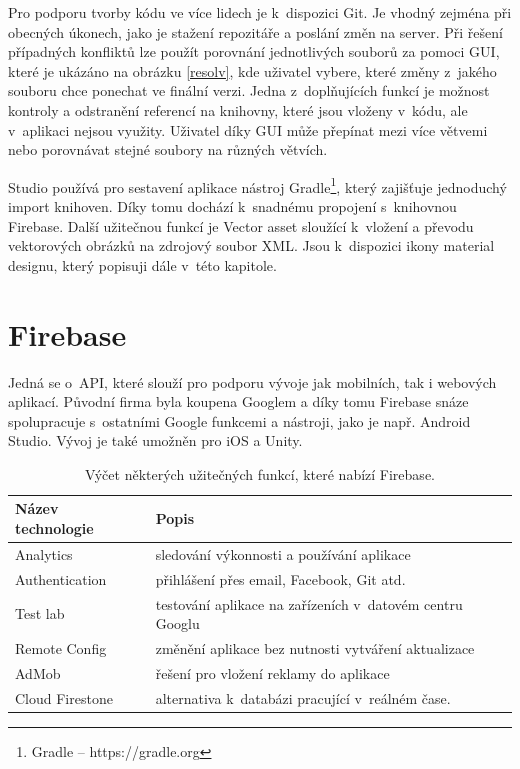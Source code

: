 Pro podporu tvorby kódu ve více lidech je k~dispozici Git. Je vhodný zejména při obecných úkonech, jako je stažení repozitáře a poslání změn na server. Při řešení případných konfliktů lze použít porovnání jednotlivých souborů za pomoci GUI, které je ukázáno na obrázku \ref{resolv}, kde uživatel vybere, které změny z~jakého souboru chce ponechat ve finální verzi. Jedna z~doplňujících funkcí je možnost kontroly a odstranění referencí na knihovny, které jsou vloženy v~kódu, ale v~aplikaci nejsou využity. Uživatel díky GUI může přepínat mezi více větvemi nebo porovnávat stejné soubory na různých větvích.

Studio používá pro sestavení aplikace nástroj Gradle\footnote{Gradle -- https://gradle.org}, který zajišťuje jednoduchý import knihoven. Díky tomu dochází k~snadnému propojení s~knihovnou Firebase. Další užitečnou funkcí je Vector asset sloužící k~vložení a převodu vektorových obrázků na zdrojový soubor XML. Jsou k~dispozici ikony material designu, který popisuji dále v~této kapitole.  

\section{Firebase}

Jedná se o~API, které slouží pro podporu vývoje jak mobilních, tak i webových aplikací. Původní firma byla koupena Googlem a díky tomu Firebase snáze spolupracuje s~ostatními Google funkcemi a nástroji, jako je např. Android Studio. Vývoj je také umožněn pro iOS a Unity.

\begin{table}
\centering
    \begin{tabular}{| l | l |}
    \hline
    Název technologie & Popis \\ \hline
    Analytics & sledování výkonnosti a používání aplikace \\ \hline
  	Authentication & přihlášení přes email, Facebook, Git atd. \\ \hline
    Test lab & testování aplikace na zařízeních v~datovém centru Googlu \\ \hline
    Remote Config & změnění aplikace bez nutnosti vytváření aktualizace \\ \hline
    AdMob & řešení pro vložení reklamy do aplikace \\ \hline
    Cloud Firestone & alternativa k~databázi pracující v~reálném čase. \\ \hline   
    \end{tabular}
    \caption{Výčet některých užitečných funkcí, které nabízí Firebase. }
    \label{table}
\end{table}

